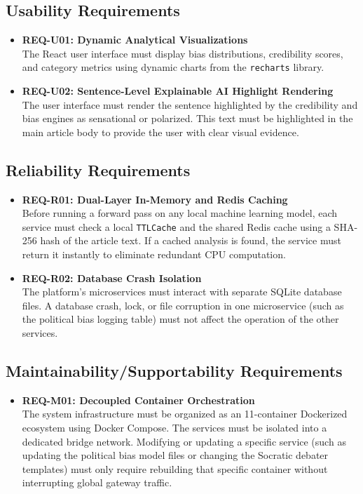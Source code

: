 \subsection{Usability Requirements}
\begin{itemize}
    \item \textbf{REQ-U01: Dynamic Analytical Visualizations} \\
    The React user interface must display bias distributions, credibility scores, and category metrics using dynamic charts from the \texttt{recharts} library.
    \item \textbf{REQ-U02: Sentence-Level Explainable AI Highlight Rendering} \\
    The user interface must render the sentence highlighted by the credibility and bias engines as sensational or polarized. This text must be highlighted in the main article body to provide the user with clear visual evidence.
\end{itemize}

\subsection{Reliability Requirements}
\begin{itemize}
    \item \textbf{REQ-R01: Dual-Layer In-Memory and Redis Caching} \\
    Before running a forward pass on any local machine learning model, each service must check a local \texttt{TTLCache} and the shared Redis cache using a SHA-256 hash of the article text. If a cached analysis is found, the service must return it instantly to eliminate redundant CPU computation.
    \item \textbf{REQ-R02: Database Crash Isolation} \\
    The platform's microservices must interact with separate SQLite database files. A database crash, lock, or file corruption in one microservice (such as the political bias logging table) must not affect the operation of the other services.
\end{itemize}

\subsection{Maintainability/Supportability Requirements}
\begin{itemize}
    \item \textbf{REQ-M01: Decoupled Container Orchestration} \\
    The system infrastructure must be organized as an 11-container Dockerized ecosystem using Docker Compose. The services must be isolated into a dedicated bridge network. Modifying or updating a specific service (such as updating the political bias model files or changing the Socratic debater templates) must only require rebuilding that specific container without interrupting global gateway traffic.
\end{itemize}

